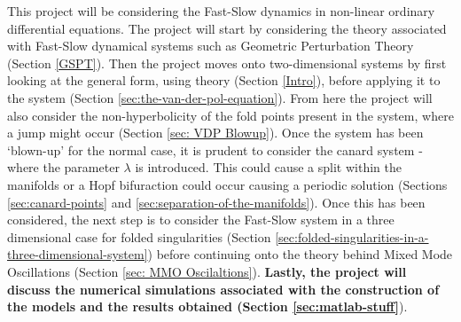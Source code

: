This project will be considering the Fast-Slow dynamics in non-linear ordinary differential equations. The project will start by considering the theory associated with Fast-Slow dynamical systems such as Geometric Perturbation Theory (Section \ref{GSPT}). Then the project moves onto two-dimensional systems by first looking at the general form, using \citet{krupa2001} theory (Section \ref{Intro}), before applying it to the \vdp system (Section \ref{sec:the-van-der-pol-equation}). From here the project will also consider the non-hyperbolicity of the fold points present in the system, where a jump might occur (Section \ref{sec: VDP Blowup}). Once the system has been `blown-up' for the normal case, it is prudent to consider the canard system - where the parameter $ \lambda $ is introduced. This could cause a split within the manifolds or a Hopf bifuraction could occur causing a periodic solution (Sections \ref{sec:canard-points} and \ref{sec:separation-of-the-manifolds}). Once this has been considered, the next step is to consider the Fast-Slow system in a three dimensional case for folded singularities (Section \ref{sec:folded-singularities-in-a-three-dimensional-system}) before continuing onto the theory behind Mixed Mode Oscillations (Section \ref{sec: MMO Oscilaltions}). \textbf{Lastly, the project will discuss the numerical simulations associated with the construction of the models and the results obtained (Section \ref{sec:matlab-stuff}}).
